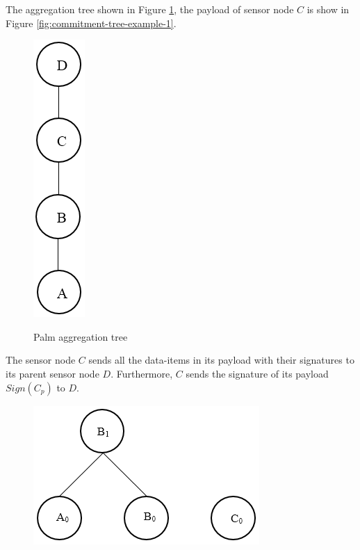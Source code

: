 	\begin{exmp}
	The aggregation tree shown in Figure \ref{fig:Palm aggregation tree}, the payload of sensor node $C$ is show in Figure \ref{fig:commitment-tree-example-1}.
			\begin{figure}[h!]
				\centering
				\includegraphics[scale = 0.5]{images/palm-aggregation-tree.png}\\
				\caption{Palm aggregation tree}
				\label{fig:Palm aggregation tree}
			\end{figure}
		The sensor node $C$ sends all the data-items in its payload with their signatures to its parent sensor node $D$.
		Furthermore, $C$ sends the signature of its payload $Sign(C_{p})$ to $D$.\\
			\begin{figure}[h!]
				\centering
				\includegraphics[scale = 0.5]{images/commitment-payload-of-C.png}

\end{figure}
\end{exmp}

